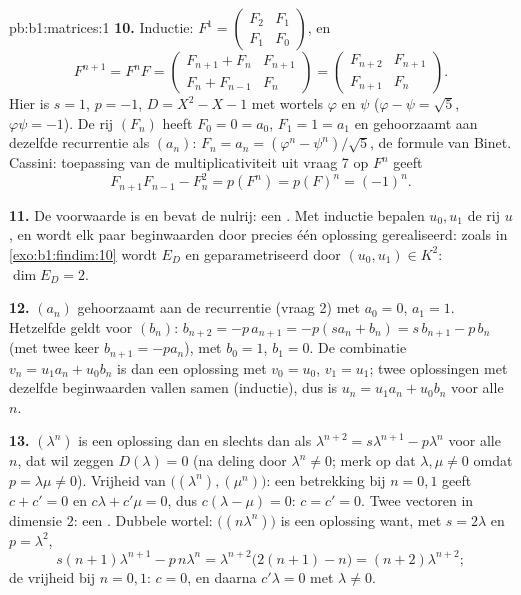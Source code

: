 \begin{solution}{pb:b1:matrices:1}
\textbf{10.} Inductie: $F^1 = \begin{pmatrix} F_2 & F_1\\ F_1 &
F_0\end{pmatrix}$, en
\[
F^{n+1} = F^n F =
\begin{pmatrix} F_{n+1} + F_n & F_{n+1}\\
F_n + F_{n-1} & F_n \end{pmatrix}
= \begin{pmatrix} F_{n+2} & F_{n+1}\\ F_{n+1} & F_n
\end{pmatrix}.
\]
Hier is $s = 1$, $p = -1$, $D = X^2 - X - 1$ met wortels $\varphi$
en $\psi$ ($\varphi - \psi = \sqrt5$, $\varphi\psi = -1$). De rij
$(F_n)$ heeft $F_0 = 0 = a_0$, $F_1 = 1 = a_1$ en gehoorzaamt aan
dezelfde recurrentie als $(a_n)$: $F_n = a_n = (\varphi^n -
\psi^n)/\sqrt5$, de formule van Binet. Cassini: toepassing van de
multiplicativiteit uit vraag 7 op $F^n$ geeft
\[
F_{n+1}F_{n-1} - F_n^2 = p(F^n) = p(F)^n = (-1)^n .
\]

\textbf{11.} De voorwaarde is  en bevat de nulrij: een
. Met inductie bepalen $u_0, u_1$ de rij $u$ , en
wordt elk paar beginwaarden door precies één oplossing
gerealiseerd: zoals in \cref{exo:b1:findim:10} wordt $E_D$
 en  geparametriseerd door $(u_0, u_1) \in K^2$:
$\dim E_D = 2$.

\textbf{12.} $(a_n)$ gehoorzaamt aan de recurrentie (vraag 2) met
$a_0 = 0$, $a_1 = 1$. Hetzelfde geldt voor $(b_n)$: $b_{n+2} =
-p\,a_{n+1} = -p(s a_n + b_n) = s\,b_{n+1} - p\,b_n$ (met twee keer
$b_{n+1} = -pa_n$), met $b_0 = 1$, $b_1 = 0$. De combinatie $v_n =
u_1 a_n + u_0 b_n$ is dan een oplossing met $v_0 = u_0$, $v_1 =
u_1$; twee oplossingen met dezelfde beginwaarden vallen samen
(inductie), dus is $u_n = u_1 a_n + u_0 b_n$ voor alle $n$.

\textbf{13.} $(\lambda^n)$ is een oplossing dan en slechts dan als
$\lambda^{n+2} = s\lambda^{n+1} - p\lambda^n$ voor alle $n$, dat
wil zeggen $D(\lambda) = 0$ (na deling door $\lambda^n \neq 0$;
merk op dat $\lambda, \mu \neq 0$ omdat $p = \lambda\mu \neq 0$).
Vrijheid van $\bigl((\lambda^n), (\mu^n)\bigr)$: een betrekking bij
$n = 0, 1$ geeft $c + c' = 0$ en $c\lambda + c'\mu = 0$, dus
$c(\lambda - \mu) = 0$: $c = c' = 0$. Twee  vectoren in
dimensie $2$: een . Dubbele wortel: $\bigl((n\lambda^n)\bigr)$
is een oplossing want, met $s = 2\lambda$ en $p = \lambda^2$,
\[
s(n+1)\lambda^{n+1} - p\,n\lambda^n
= \lambda^{n+2}\bigl(2(n+1) - n\bigr) = (n+2)\lambda^{n+2} ;
\]
de vrijheid bij $n = 0, 1$: $c = 0$, en daarna $c'\lambda = 0$ met
$\lambda \neq 0$.


\end{solution}
